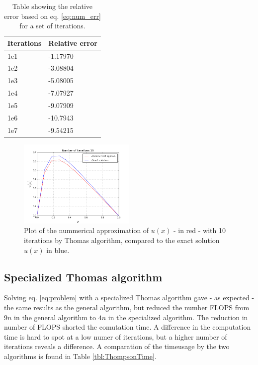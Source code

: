 \documentclass[twoside,twocolumn]{article}
\begin{document}
\begin{table}[htp]
\centering
\begin{tabular}{|l|l|} \hline
Iterations & Relative error\\ \hline
1e1 & -1.17970\\
1e2 & -3.08804\\
1e3 & -5.08005\\
1e4 & -7.07927\\
1e5 & -9.07909\\
1e6 & -10.7943\\
1e7 & -9.54215\\ \hline
\end{tabular}
\caption{Table showing the relative error based on eq. \ref{eq:num_err} for a set of iterations.}\label{tbl:error}
\end{table}

\begin{figure}[htp]
\includegraphics[width=0.5\textwidth]{./figures/b-run10.png} 
\caption{Plot of the nummerical approximation of $u(x)$ - in red - with 10 iterations by Thomas algorithm, compared to the exact solution $u(x)$ in blue.} \label{fig:Thomas10}
\end{figure}


\subsection{Specialized Thomas algorithm}
Solving eq. \ref{eq:problem} with a specialized Thomas algorithm gave - as expected - the same results as the general algorithm, but reduced the number FLOPS from $9n$ in the general algorithm to $4n$ in the specialized algorithm. The reduction in number of FLOPS shorted the comutation time. A difference in the computation time is hard to spot at a low numer of iterations, but a higher number of iterations reveals a difference. A comparation of the timeusage by the two algorithms is found in Table \ref{tbl:ThompsonTime}.
\end{document}
